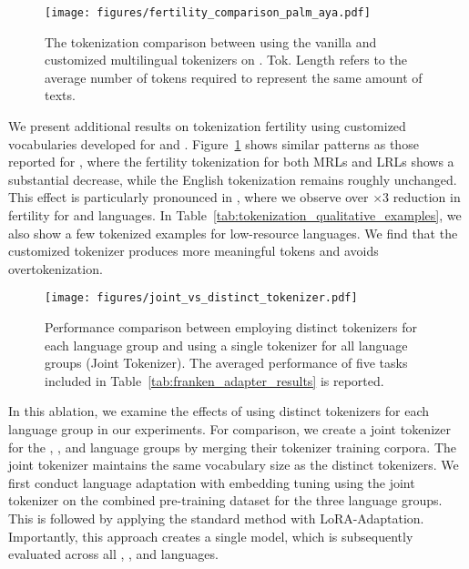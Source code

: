 \begin{figure}[t]
    \setlength{\abovecaptionskip}{-0.0001cm}
    \setlength{\belowcaptionskip}{-0.35cm}
    \centering
    \texttt{[image: figures/fertility\_comparison\_palm\_aya.pdf]}
    \vspace{-6mm}
    \caption{The tokenization comparison between using the vanilla and customized multilingual tokenizers on \gemmatwo. Tok. Length refers to the average number of tokens required to represent the same amount of texts.}
    \vspace{-4mm}
    \label{fig:fertility_comparison_palm_aya}
\end{figure}
We present additional results on tokenization fertility using customized vocabularies developed for \palmtwo and \aya. Figure~\ref{fig:fertility_comparison_palm_aya} shows similar patterns as those reported for \gemmatwo, where the fertility tokenization for both MRLs and LRLs shows a substantial decrease, while the English tokenization remains roughly unchanged. This effect is particularly pronounced in \aya, where we observe over $\times$3 reduction in fertility for \sea and \ind languages. In Table~\ref{tab:tokenization_qualitative_examples}, we also show a few tokenized examples for low-resource languages. We find that the customized tokenizer produces more meaningful tokens and avoids overtokenization.

\begin{figure}[t]
    \setlength{\abovecaptionskip}{-0.0001cm}
    \setlength{\belowcaptionskip}{-0.35cm}
    \centering
    \texttt{[image: figures/joint\_vs\_distinct\_tokenizer.pdf]}
    \vspace{-8mm}
    \caption{Performance comparison between employing distinct tokenizers for each language group and using a single tokenizer for all language groups (\ie Joint Tokenizer). The averaged performance of five tasks included in Table~\ref{tab:franken_adapter_results} is reported.}
    \vspace{-4mm}
    \label{fig:joint_vs_distinct_tokenizer}
\end{figure}
In this ablation, we examine the effects of using distinct tokenizers for each language group in our experiments. For comparison, we create a joint tokenizer for the \sea, \afr, and \ind language groups by merging their tokenizer training corpora. The joint tokenizer maintains the same vocabulary size as the distinct tokenizers. We first conduct language adaptation with embedding tuning using the joint tokenizer on the combined pre-training dataset for the three language groups. This is followed by applying the standard \ouradapter method with LoRA-Adaptation. Importantly, this approach creates a single model, which is subsequently evaluated across all \sea, \afr, and \ind languages.

